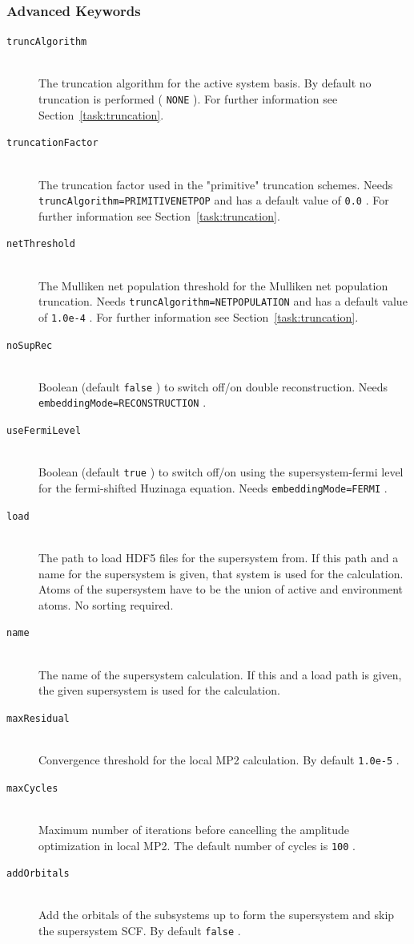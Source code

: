 \documentclass[bibliography=totocnumbered,a4paper,10pt,oneside]{scrbook}
\newcommand{\ttt}[1]{%
  \begingroup\setlength{\fboxsep}{1pt}%
  \colorbox{serenity-green!30}{\texttt{\hspace*{2pt}\vphantom{(g}#1\hspace*{2pt}}}%
  \endgroup
}
\begin{document}
\subsubsection{Advanced Keywords}
\begin{description}
	\item[\texttt{truncAlgorithm}]\hfill \\
	The truncation algorithm for the active system basis. By default no truncation is performed (\ttt{NONE}). For further information see Section~\ref{task:truncation}.
	\item[\texttt{truncationFactor}]\hfill \\
	The truncation factor used in the "primitive" truncation schemes. Needs \ttt{truncAlgorithm=PRIMITIVENETPOP} and has a default value of \ttt{0.0}. For further information see Section~\ref{task:truncation}.
	\item[\texttt{netThreshold}]\hfill \\
	The Mulliken net population threshold for the Mulliken net population truncation. Needs \ttt{truncAlgorithm=NETPOPULATION} and has a default value of \ttt{1.0e-4}.  For further information see Section~\ref{task:truncation}.
	\item[\texttt{noSupRec}]\hfill \\
	Boolean (default \ttt{false}) to switch off/on double reconstruction. Needs \ttt{embeddingMode=RECONSTRUCTION}.
	\item[\texttt{useFermiLevel}]\hfill \\
	Boolean (default \ttt{true}) to switch off/on using the supersystem-fermi level for the fermi-shifted Huzinaga equation. Needs \ttt{embeddingMode=FERMI}.	
  \item[\texttt{load}]\hfill \\
  The path to load HDF5 files for the supersystem from. If this path and a name for the supersystem is given, that system is used for the calculation. Atoms of the supersystem have to be the union of active and environment atoms. No sorting required.  
  \item[\texttt{name}]\hfill \\
  The name of the supersystem calculation. If this and a load path is given, the given supersystem is used for the calculation.
  \item[\texttt{maxResidual}]\hfill \\
  Convergence threshold for the local MP2 calculation. By default \ttt{1.0e-5}.
  \item[\texttt{maxCycles}]\hfill \\
  Maximum number of iterations before cancelling the amplitude optimization in local MP2. The default number of cycles is \ttt{100}.   
  \item[\texttt{addOrbitals}]\hfill \\
  Add the orbitals of the subsystems up to form the supersystem and skip the supersystem SCF. By default \ttt{false}.
\end{description}
\end{document}
